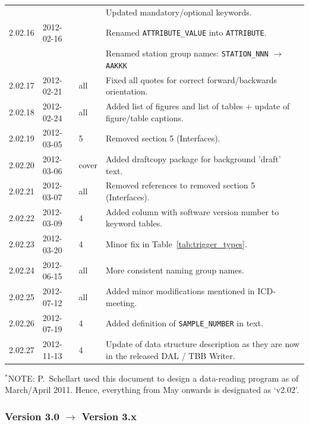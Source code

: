 \documentclass[a4paper,10pt,bibtotoc]{scrartcl}
\begin{document}
\begin{center}
\begin{supertabular}{lllp{9.5cm}}
            &            &       & Updated mandatory/optional
                                   keywords.\\
    2.02.16 & 2012-02-16 & & Renamed \verb|ATTRIBUTE_VALUE| into \verb|ATTRIBUTE|.\\
            &            & & Renamed station group names: \verb|STATION_NNN| $\to$ \verb|AAKKK|\\
    2.02.17 & 2012-02-21 & all & Fixed all quotes for correct forward/backwards orientation.\\
    2.02.18 & 2012-02-24 & all & Added list of figures and list of tables
                                 + update of figure/table captions.\\
    2.02.19 & 2012-03-05 & 5     & Removed section 5 (Interfaces).\\
    2.02.20 & 2012-03-06 & cover & Added draftcopy package for background 'draft' text.\\
    2.02.21 & 2012-03-07 & all   & Removed references to removed section 5 (Interfaces).\\
    2.02.22 & 2012-03-09 & 4     & Added column with software version number to keyword tables.\\
    2.02.23 & 2012-03-20 & 4     & Minor fix in Table~\ref{tab:trigger_types}.\\
    2.02.24 & 2012-06-15 & all   & More consistent naming group names.\\
    2.02.25 & 2012-07-12 & all   & Added minor modifications mentioned in ICD-meeting.\\
    2.02.26 & 2012-07-19 & 4     & Added definition of \verb|SAMPLE_NUMBER| in text.\\
    2.02.27 & 2012-11-13 & 4     & Update of data structure description as they are now in the released DAL / TBB Writer.\\
 \end{supertabular}
\end{center}

$^*$NOTE: P.\ Schellart used this document to design a data-reading program as
of March/April 2011. %
Hence, everything from May onwards is designated as `v2.02'.

\subsubsection*{Version 3.0 $\rightarrow$ Version 3.x}
\end{document}
